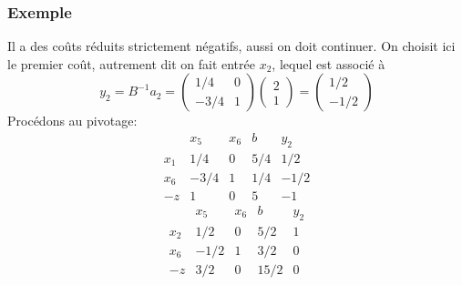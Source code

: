 \documentclass[usepdftitle=false]{beamer}
\begin{document}
\begin{frame}
\frametitle{Exemple}

Il a des coûts réduits strictement négatifs, aussi on doit continuer. On choisit ici le premier coût, autrement dit on fait entrée $x_2$, lequel est associé à
\[
y_2 = B^{-1}a_2 =
\begin{pmatrix}
1/4 & 0 \\
-3/4 & 1
\end{pmatrix}
\begin{pmatrix}
2 \\ 1
\end{pmatrix}
=
\begin{pmatrix}
1/2 \\ -1/2
\end{pmatrix}
\]
Procédons au pivotage:
\[
\begin{matrix}
    & x_5 & x_6 & b & y_2 \\
x_1 & 1/4 & 0 & 5/4 & 1/2 \\
x_6 & -3/4 & 1 & 1/4 & -1/2 \\
-z & 1 & 0 & 5 & -1
\end{matrix}
\]
\[
\begin{matrix}
    & x_5 & x_6 & b & y_2 \\
x_2 & 1/2 & 0 & 5/2 & 1 \\
x_6 & -1/2 & 1 & 3/2 & 0 \\
-z & 3/2 & 0 & 15/2 & 0
\end{matrix}
\]

\end{frame}
\end{document}
